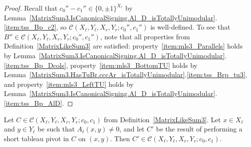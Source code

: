 \begin{proof}
    \leanok
    Recall that $c_{0}'' - c_{1}'' \in \{0, \pm 1\}^{X_{r}}$ by Lemma~\ref{MatrixSum3.IsCanonicalSigning.Al_D_isTotallyUnimodular}.\ref{item:tss_Bp_c2}, so $\mathcal{C} (X_{\ell}, Y_{\ell}, X_{r}, Y_{r}; c_{0}'', c_{1}'')$ is well-defined. To see that $B'' \in \mathcal{C} (X_{\ell}, Y_{\ell}, X_{r}, Y_{r}; c_{0}'', c_{1}'')$, note that all properties from Definition~\ref{MatrixLikeSum3} are satisfied: property~\ref{item:mls3_Parallels} holds by Lemma~\ref{MatrixSum3.IsCanonicalSigning.Al_D_isTotallyUnimodular}.\ref{item:tss_Bp_Dcols}, property~\ref{item:mls3_BottomTU} holds by Lemma~\ref{MatrixSum3.HasTuBr.cccAr_isTotallyUnimodular}.\ref{item:tss_Brp_tu3}, and property~\ref{item:mls3_LeftTU} holds by Lemma~\ref{MatrixSum3.IsCanonicalSigning.Al_D_isTotallyUnimodular}.\ref{item:tss_Bp_AlD}.
\end{proof}

\begin{lemma}
    \label{MatrixLikeSum3.shortTableauPivot}
    \leanok
    Let $C \in \mathcal{C} (X_{\ell}, Y_{\ell}, X_{r}, Y_{r}; c_{0}, c_{1})$ from Definition~\ref{MatrixLikeSum3}. Let $x \in X_{\ell}$ and $y \in Y_{\ell}$ be such that $A_{\ell} (x, y) \neq 0$, and let $C'$ be the result of performing a short tableau pivot in $C$ on $(x, y)$. Then $C' \in \mathcal{C} (X_{\ell}, Y_{\ell}, X_{r}, Y_{r}; c_{0}, c_{1})$.
\end{lemma}

